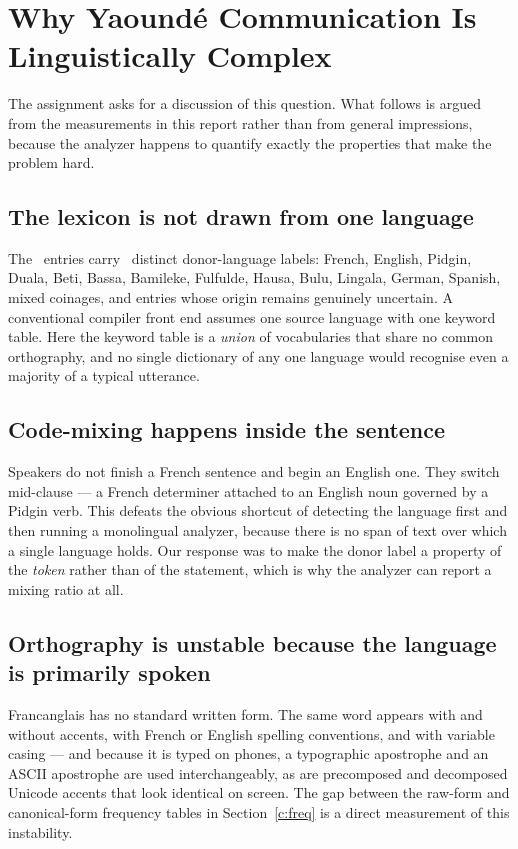 \section{Why Yaound\'e Communication Is Linguistically Complex}\label{c:complexity}

The assignment asks for a discussion of this question. What follows is argued from the
measurements in this report rather than from general impressions, because the analyzer
happens to quantify exactly the properties that make the problem hard.

\subsection{The lexicon is not drawn from one language}

The \LexiconTotal\ entries carry \OriginCount\ distinct donor-language labels: French,
English, Pidgin, Duala, Beti, Bassa, Bamileke, Fulfulde, Hausa, Bulu, Lingala, German,
Spanish, mixed coinages, and entries whose origin remains genuinely uncertain. A
conventional compiler front end assumes one source language with one keyword table. Here
the keyword table is a \emph{union} of vocabularies that share no common orthography, and
no single dictionary of any one language would recognise even a majority of a typical
utterance.

\subsection{Code-mixing happens inside the sentence}

Speakers do not finish a French sentence and begin an English one. They switch mid-clause
--- a French determiner attached to an English noun governed by a Pidgin verb. This defeats
the obvious shortcut of detecting the language first and then running a monolingual
analyzer, because there is no span of text over which a single language holds. Our response
was to make the donor label a property of the \emph{token} rather than of the statement,
which is why the analyzer can report a mixing ratio at all.

\subsection{Orthography is unstable because the language is primarily spoken}

Francanglais has no standard written form. The same word appears with and without accents,
with French or English spelling conventions, and with variable casing --- and because it is
typed on phones, a typographic apostrophe and an ASCII apostrophe are used interchangeably,
as are precomposed and decomposed Unicode accents that look identical on screen. The gap
between the raw-form and canonical-form frequency tables in Section~\ref{c:freq} is a direct
measurement of this instability.

